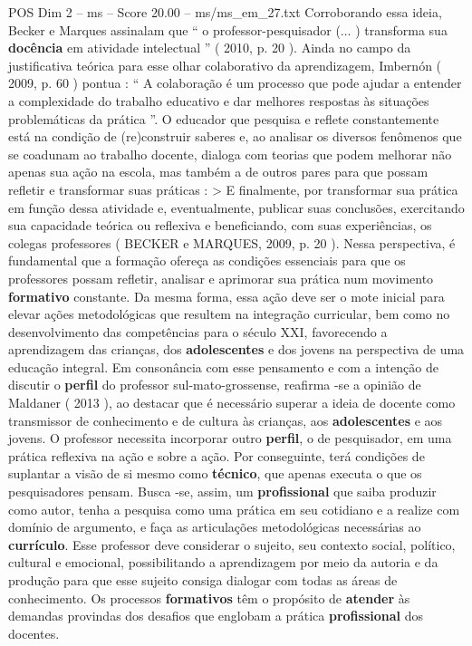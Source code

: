 \begin{textsample}{POS Dim 2 – ms – Score 20.00 – ms/ms\_em\_27.txt}
Corroborando essa ideia, Becker e Marques assinalam que “ o professor-pesquisador (... ) transforma sua \textbf{docência} em atividade intelectual ” ( 2010, p. 20 ).
Ainda no campo da justificativa teórica para esse olhar colaborativo da aprendizagem, Imbernón ( 2009, p. 60 ) pontua : “ A colaboração é um processo que pode ajudar a entender a complexidade do trabalho educativo e dar melhores respostas às situações problemáticas da prática ”.
O educador que pesquisa e reflete constantemente está na condição de (re)construir saberes e, ao analisar os diversos fenômenos que se coadunam ao trabalho docente, dialoga com teorias que podem melhorar não apenas sua ação na escola, mas também a de outros pares para que possam refletir e transformar suas práticas : > E finalmente, por transformar sua prática em função dessa atividade e, eventualmente, publicar suas conclusões, exercitando sua capacidade teórica ou reflexiva e beneficiando, com suas experiências, os colegas professores ( BECKER e MARQUES, 2009, p. 20 ).
Nessa perspectiva, é fundamental que a formação ofereça as condições essenciais para que os professores possam refletir, analisar e aprimorar sua prática num movimento \textbf{formativo} constante.
Da mesma forma, essa ação deve ser o mote inicial para elevar ações metodológicas que resultem na integração curricular, bem como no desenvolvimento das competências para o século XXI, favorecendo a aprendizagem das crianças, dos \textbf{adolescentes} e dos jovens na perspectiva de uma educação integral.
Em consonância com esse pensamento e com a intenção de discutir o \textbf{perfil} do professor sul-mato-grossense, reafirma -se a opinião de Maldaner ( 2013 ), ao destacar que é necessário superar a ideia de docente como transmissor de conhecimento e de cultura às crianças, aos \textbf{adolescentes} e aos jovens.
O professor necessita incorporar outro \textbf{perfil}, o de pesquisador, em uma prática reflexiva na ação e sobre a ação.
Por conseguinte, terá condições de suplantar a visão de si mesmo como \textbf{técnico}, que apenas executa o que os pesquisadores pensam.
Busca -se, assim, um \textbf{profissional} que saiba produzir como autor, tenha a pesquisa como uma prática em seu cotidiano e a realize com domínio de argumento, e faça as articulações metodológicas necessárias ao \textbf{currículo}.
Esse professor deve considerar o sujeito, seu contexto social, político, cultural e emocional, possibilitando a aprendizagem por meio da autoria e da produção para que esse sujeito consiga dialogar com todas as áreas de conhecimento.
Os processos \textbf{formativos} têm o propósito de \textbf{atender} às demandas provindas dos desafios que englobam a prática \textbf{profissional} dos docentes.

\end{textsample}
